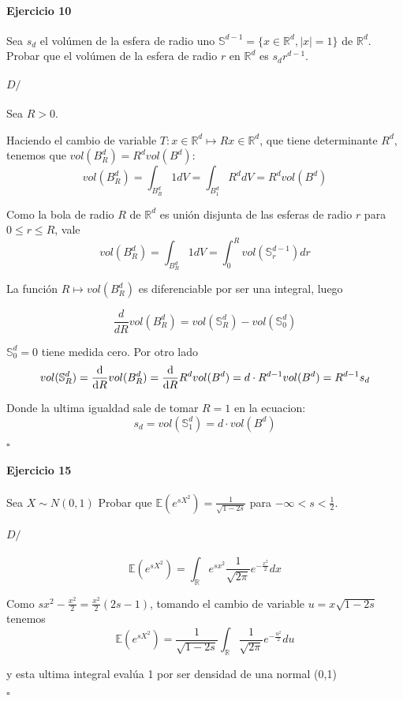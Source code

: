 \documentclass[10pt,a4paper]{article}
\newcommand{\R}{ \mathbb R }
\newcommand{\E}{ \mathbb E }
\newenvironment{ejercicio}[3]
{
	\paragraph{Ejercicio #1}
	#2
	\paragraph{$D/$}
	#3
	\begin{flushright}$\square$\end{flushright}
}{
}
\begin{document}
\begin{ejercicio}{10}{
	Sea $s_d$ el vol\'umen de la esfera de radio uno $\mathbb S^{d-1} = \{x \in \R^d, |x| = 1\}$ de $\R^d$.
	Probar que el vol\'umen de la esfera de radio $r$ en $\R^d$ es $s_d r^{d-1}$.
}{
	Sea $R>0$.

	Haciendo el cambio de variable $T: x \in \R^d \mapsto Rx \in \R^d$, que tiene determinante $R^d$,
	tenemos que $vol(B_R^d) = R^d vol(B^d)$:
	$$
		vol(B_R^d)
		=
		\int_{B_R^d} 1 dV
		=
		\int_{B_1^d} R^d dV
		=
		R^d vol(B^d)
	$$

	Como la bola de radio $R$ de $\R^d$ es unión disjunta de las esferas de radio $r$ para $0 \le r \le R$, vale
	$$
	vol(B_R^d)
	=
	\int_{B_R^d} 1 dV
	=
	\int_0^R vol(\mathbb S_r^{d-1}) dr
	$$

	La función $R \mapsto vol(B_R^d)$ es diferenciable por ser una integral, luego

	$$
		\dfrac{d}{dR} vol(B_R^d)
		=
		vol(\mathbb S_R^d) - vol(\mathbb S_0^d)
	$$

	$\mathbb S_0^d = {0}$ tiene medida cero. Por otro lado
	$$
	vol(\mathbb S_R^d)
	=
	\dfrac{\text d}{\text d R} vol(B_R^d)
	=
	\dfrac{\text d}{\text dR} R^d vol(B^d)
	=
	d \cdot R^{d-1} vol(B^d)
	=
	R^{d-1} s_d
	$$

	Donde la ultima igualdad sale de tomar $R=1$ en la ecuacion:
	$$
	s_d
	=
	vol(\mathbb S_1^d)
	=
	d \cdot vol(B^d)
	$$

}\end{ejercicio}


\begin{ejercicio}{15}{
	Sea
	$X \sim N(0,1)$
	Probar que
	$
	\E(e^{sX^2}) = \frac{1}{\sqrt{1 - 2s}}
	$ para 
	$
	-\infty < s < \frac{1}{2}
	$.
}{
	$$
		\E(e^{sX^2})
		=
		\int_\R e^{sx^2} \frac{1}{\sqrt{2\pi}} e^{-\frac{x^2}{2}} dx
	$$

	Como $sx^2 - \frac{x^2}{2} = \frac{x^2}{2}(2s-1)$, tomando el cambio de variable $u = x\sqrt{1-2s}$ tenemos
	$$
		\E(e^{sX^2})
		=
		\frac{1}{\sqrt{1 - 2s}}
		\int_\R 
		\frac{1}{\sqrt{2\pi}}
		e^{-\frac{u^2}{2}} du	
	$$
	
	y esta ultima integral eval\'ua 1 por ser densidad de una normal (0,1) 

}\end{ejercicio}
\end{document}
